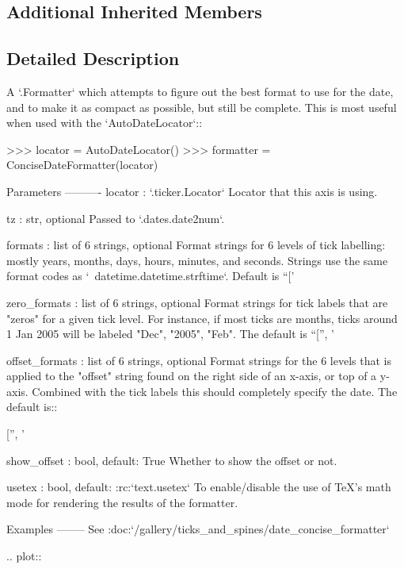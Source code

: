 \subsection*{Additional Inherited Members}


\subsection{Detailed Description}
\begin{DoxyVerb}A `.Formatter` which attempts to figure out the best format to use for the
date, and to make it as compact as possible, but still be complete. This is
most useful when used with the `AutoDateLocator`::

>>> locator = AutoDateLocator()
>>> formatter = ConciseDateFormatter(locator)

Parameters
----------
locator : `.ticker.Locator`
    Locator that this axis is using.

tz : str, optional
    Passed to `.dates.date2num`.

formats : list of 6 strings, optional
    Format strings for 6 levels of tick labelling: mostly years,
    months, days, hours, minutes, and seconds.  Strings use
    the same format codes as `~datetime.datetime.strftime`.  Default is
    ``['%

zero_formats : list of 6 strings, optional
    Format strings for tick labels that are "zeros" for a given tick
    level.  For instance, if most ticks are months, ticks around 1 Jan 2005
    will be labeled "Dec", "2005", "Feb".  The default is
    ``['', '%

offset_formats : list of 6 strings, optional
    Format strings for the 6 levels that is applied to the "offset"
    string found on the right side of an x-axis, or top of a y-axis.
    Combined with the tick labels this should completely specify the
    date.  The default is::

        ['', '%

show_offset : bool, default: True
    Whether to show the offset or not.

usetex : bool, default: :rc:`text.usetex`
    To enable/disable the use of TeX's math mode for rendering the results
    of the formatter.

Examples
--------
See :doc:`/gallery/ticks_and_spines/date_concise_formatter`

.. plot::


\end{DoxyVerb}
